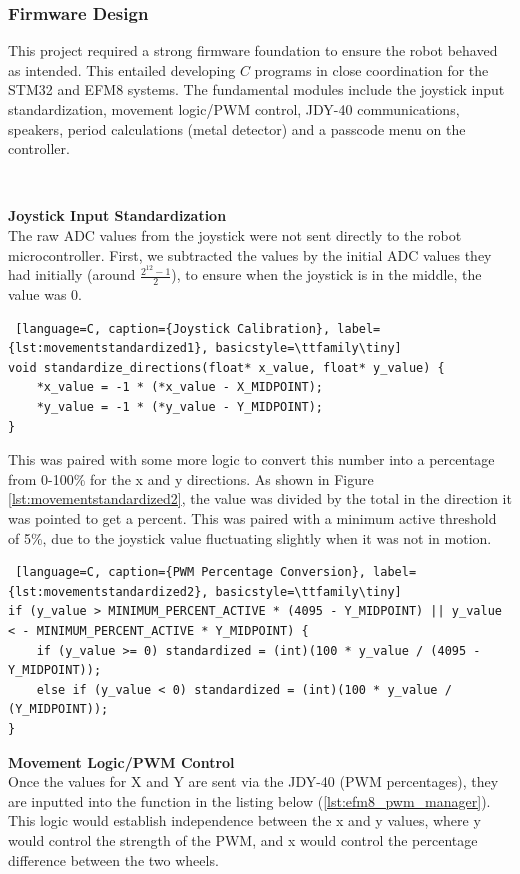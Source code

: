 \documentclass{article}
\begin{document}
\subsubsection{Firmware Design}
This project required a strong firmware foundation to ensure the robot behaved as intended. This entailed developing $C$ programs in close coordination for the STM32 and EFM8 systems.
The fundamental modules include the joystick input standardization, movement logic/PWM control, JDY-40 communications, speakers, period calculations (metal detector) and a passcode menu on the controller.

\

\textbf{Joystick Input Standardization} \\
The raw ADC values from the joystick were not sent directly to the robot microcontroller. First, we subtracted the values by the initial ADC values they had initially (around $\frac{2^{12}-1}{2}$), to ensure when the joystick is in the middle, the value was 0.

\begin{lstlisting} [language=C, caption={Joystick Calibration}, label={lst:movementstandardized1}, basicstyle=\ttfamily\tiny]
void standardize_directions(float* x_value, float* y_value) {
    *x_value = -1 * (*x_value - X_MIDPOINT);
    *y_value = -1 * (*y_value - Y_MIDPOINT);
}
\end{lstlisting}

This was paired with some more logic to convert this number into a percentage from 0-100\% for the x and y directions. As shown in Figure \ref{lst:movementstandardized2}, the value was divided by the total in the direction it was pointed to get a percent. This was paired with a minimum
 active threshold of 5\%, due to the joystick value fluctuating slightly when it was not in motion.
\begin{lstlisting} [language=C, caption={PWM Percentage Conversion}, label={lst:movementstandardized2}, basicstyle=\ttfamily\tiny]
if (y_value > MINIMUM_PERCENT_ACTIVE * (4095 - Y_MIDPOINT) || y_value < - MINIMUM_PERCENT_ACTIVE * Y_MIDPOINT) {
    if (y_value >= 0) standardized = (int)(100 * y_value / (4095 - Y_MIDPOINT));
    else if (y_value < 0) standardized = (int)(100 * y_value / (Y_MIDPOINT));
}
\end{lstlisting}

\textbf{Movement Logic/PWM Control} \\
Once the values for X and Y are sent via the JDY-40 (PWM percentages), they are inputted into the function in the listing below (\ref{lst:efm8_pwm_manager}). This logic would establish independence between the x and y values, where y would control the strength of the PWM, and x would control the percentage difference between the two wheels.
\end{document}
